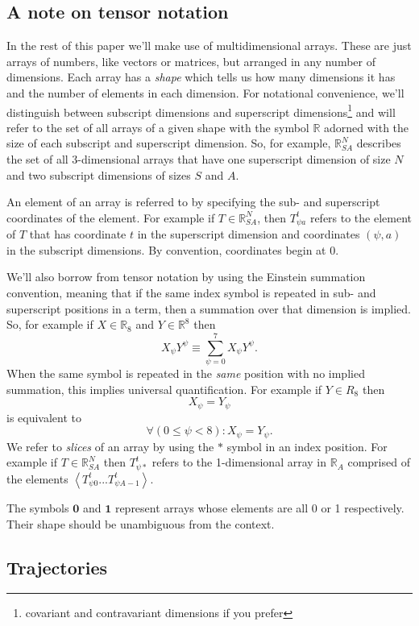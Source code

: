 \documentclass{article}
\begin{document}
\subsection{A note on tensor notation}

In the rest of this paper we'll make use of multidimensional arrays. These are just arrays of numbers, like vectors or matrices, but arranged in any number of dimensions. Each array has a \textit{shape} which tells us how many dimensions it has and the number of elements in each dimension. For notational convenience, we'll distinguish between subscript dimensions and superscript dimensions\footnote{covariant and contravariant dimensions if you prefer} and will refer to the set of all arrays of a given shape with the symbol $\mathbb{R}$ adorned with the size of each subscript and superscript dimension.  So, for example, $\mathbb{R}^N_{SA}$ describes the set of all 3-dimensional arrays that have one superscript dimension of size $N$ and two subscript dimensions of sizes $S$ and $A$.

An element of an array is referred to by specifying the sub- and superscript coordinates of the element. For example if $T \in \mathbb{R}^N_{SA}$, then $T^t_{\psi a}$ refers to the element of $T$ that has coordinate $t$ in the superscript dimension and coordinates $(\psi,a)$ in the subscript dimensions. By convention, coordinates begin at 0.

We'll also borrow from tensor notation by using the Einstein summation convention, meaning that if the same index symbol is repeated in sub- and superscript positions in a term, then a summation over that dimension is implied. So, for example if $X \in \mathbb{R}_8$ and $Y \in \mathbb{R}^8$ then
\[
X_\psi Y^\psi \equiv \sum_{\psi=0}^7 X_\psi  Y^\psi.
\]
When the same symbol is repeated in the \textit{same} position with no implied summation, this implies universal quantification. For example if $Y\in R_8$ then
\[
X_\psi = Y_\psi 
\]
is equivalent to
\[
\forall (0 \le \psi < 8) : X_\psi = Y_\psi.
\]
We refer to \textit{slices} of an array by using the $*$ symbol in an index position. For example if $T \in \mathbb{R}^N_{SA}$ then $T^t_{\psi *}$ refers to the 1-dimensional array in $\mathbb{R}_A$ comprised of the elements $\left<T^t_{\psi 0}...T^t_{\psi A-1}\right>$.

The symbols $\mathbf{0}$ and $\mathbf{1}$ represent arrays whose elements are all 0 or 1 respectively. Their shape should be unambiguous from the context.

\subsection{Trajectories}
\end{document}
